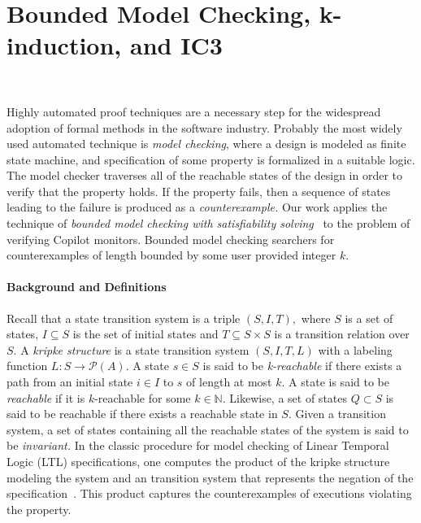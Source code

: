 \section{Bounded Model Checking,  k-induction, and IC3}~\label{sec:mck}



Highly automated proof techniques are a necessary step for the
widespread adoption of formal methods in the software industry.
Probably the most widely used automated technique is {\em model
  checking}, where a design is modeled as finite state machine, and
specification of some property is formalized in a suitable logic.  The
model checker traverses all of the 
reachable states of the design in order to verify that the property
holds.  If the property fails, then a sequence of states leading to
the failure is produced as a {\em counterexample.} Our work applies
the technique of {\em bounded model checking with satisfiability
  solving}~\cite{ClarkeBounded01,ClarkeBounded03} to the problem of
verifying Copilot monitors. Bounded model checking searchers for
counterexamples of length bounded by some user provided integer $k.$


\paragraph{Background and Definitions} Recall that a state transition system is a triple $(S,I,T),$
where $S$ is a set of states, $I \subseteq S$ is the set of initial
states and $T \subseteq S \times S $ is a transition relation over $S.$ A {\em kripke
  structure} is a state transition system $(S,I,T,L)$  with a labeling function
$L: S \rightarrow  \mathcal{P}(A)$.  A state $s 
\in S$ is said to be {\em k-reachable} if there exists a path from an
initial state $i\in I$ to $s$ of length at most $k.$ A state is said
to be {\em reachable} if it is $k$-reachable for some $k\in \mathbb{N}.$
Likewise, a set of states $Q \subset S$ is said to be reachable if
there exists a reachable state in $S.$  Given a transition system, a
set of states containing all the reachable states of the system is
said to be {\em invariant.} In the classic procedure for model checking of Linear
Temporal Logic (LTL) specifications, one computes the product of
the kripke structure modeling the system and an transition system that
represents the negation of the specification~\cite{ClarkeMC}. This product captures
the counterexamples of executions violating the property. 

